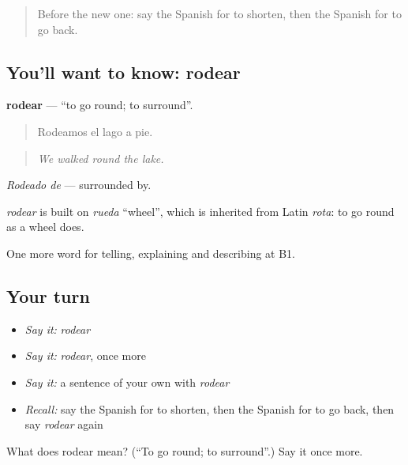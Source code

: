 \begin{quote}
Before the new one: say the Spanish for to shorten, then the Spanish for to go back.
\end{quote}

\subsection*{You'll want to know: rodear}
\textbf{rodear} — \textquotedblleft{}to go round; to surround\textquotedblright{}.

\begin{quote}
Rodeamos el lago a pie.
\end{quote}

\begin{quote}
\emph{We walked round the lake.}
\end{quote}

\emph{Rodeado de} — surrounded by.

\begin{cousinweb}
\emph{rodear} is built on \emph{rueda} \textquotedblleft{}wheel\textquotedblright{}, which is inherited from Latin \emph{rota}: to go round as a wheel does.
\end{cousinweb}

\begin{grammarlens}[title={What you've built}]
One more word for telling, explaining and describing at B1.
\end{grammarlens}

\subsection*{Your turn}
\begin{itemize}
\raggedright
  \item \emph{Say it:} \emph{rodear}
  \item \emph{Say it:} \emph{rodear}, once more
  \item \emph{Say it:} a sentence of your own with \emph{rodear}
  \item \emph{Recall:} say the Spanish for to shorten, then the Spanish for to go back, then say \emph{rodear} again
\end{itemize}

\begin{tcolorbox}[breakable,colback=teal!4,colframe=teal!35!black,title={Before you move on}]
What does rodear mean? (\textquotedblleft{}To go round; to surround\textquotedblright{}.) Say it once more.
\end{tcolorbox}
